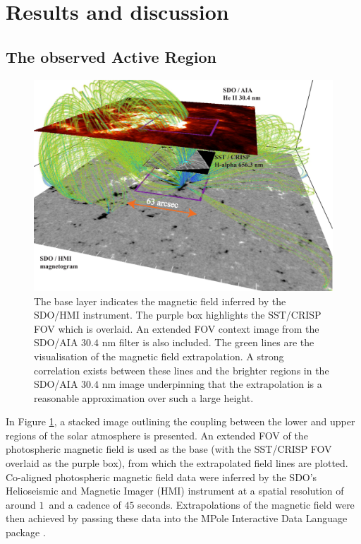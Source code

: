 \section{Results and discussion}
\label{sect2}

\subsection{The observed Active Region}

	\begin{figure}
		\centering
		\includegraphics[width=\textwidth]{full_overview.pdf}
		\caption
		{
		The base layer indicates the magnetic field inferred by the SDO/HMI instrument.
		The purple box highlights the SST/CRISP FOV which is overlaid.
		An extended FOV context image from the SDO/AIA $30.4$ nm filter is also included.
		The green lines are the visualisation of the magnetic field extrapolation.
		A strong correlation exists between these lines and the brighter regions in the SDO/AIA $30.4$ nm image underpinning that the extrapolation is a reasonable approximation over such a large height.
		}
		\label{mag_field}
	\end{figure}

	In Figure \ref{mag_field}, a stacked image outlining the coupling between the lower and upper regions of the solar atmosphere is presented.
	An extended FOV of the photospheric magnetic field is used as the base (with the SST/CRISP FOV overlaid as the purple box), from which the extrapolated field lines are plotted.
	Co-aligned photospheric magnetic field data were inferred by the SDO's Helioseismic and Magnetic Imager (HMI) instrument at a spatial resolution of around $1$\arcsecs\ and a cadence of $45$ seconds.
	Extrapolations of the magnetic field were then achieved by passing these data into the MPole Interactive Data Language package \citep{Longcope1996,Longcope2002}.

